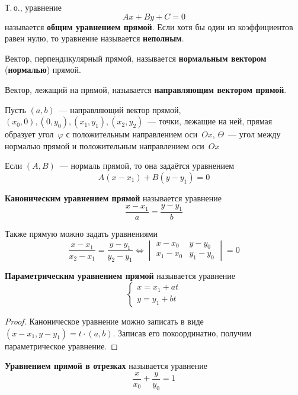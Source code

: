  Т.\,о., уравнение
\begin{equation*}
Ax + By + C = 0
\end{equation*}
называется \textbf{общим уравнением прямой}.
Если хотя бы один из коэффициентов равен нулю, то уравнение называется \textbf{неполным}.

 Вектор, перпендикулярный прямой, называется \textbf{нормальным вектором} (\textbf{нормалью}) прямой.

Вектор, лежащий на прямой, называется \textbf{направляющим вектором прямой}.

Пусть $(a, b)$~--- направляющий вектор прямой, $(x_0, 0), (0, y_0), (x_1, y_1), (x_2, y_2)$~--- точки, лежащие на ней, прямая образует угол~$\varphi$ с положительным направлением оси~$Ox$, $\Theta$~--- угол между нормалью прямой и положительным направлением оси~$Ox$

Если $(A, B)$~--- нормаль прямой, то она задаётся уравнением
\begin{equation*}
A(x - x_1) + B(y - y_1) = 0
\end{equation*}

\textbf{Каноническим уравнением прямой} называется уравнение
\begin{equation*}
\frac{x - x_1}a = \frac{y - y_1}b
\end{equation*}

Также прямую можно задать уравнениями
\begin{equation*}
\frac{x - x_1}{x_2 - x_1} = \frac{y - y_1}{y_2 - y_1} \Leftrightarrow
\begin{vmatrix}
x - x_0 & y - y_0 \\
x_1 - x_0 & y_1 - y_0
\end{vmatrix} = 0
\end{equation*}

\textbf{Параметрическим уравнением прямой} называется уравнение
\begin{equation*}
\begin{cases}
x = x_1 + at \\
y = y_1 + bt
\end{cases}
\end{equation*}
\begin{proof}
Каноническое уравнение можно записать в виде $(x - x_1, y - y_1) = t \cdot (a, b)$.
Записав его покоординатно, получим параметрическое уравнение.
\end{proof}

\textbf{Уравнением прямой в отрезках} называется уравнение
\begin{equation*}
\frac{x}{x_0} + \frac{y}{y_0} = 1
\end{equation*}

